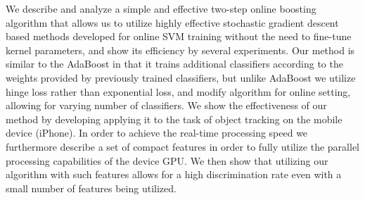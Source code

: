 


\begin{abstracts}        %

We describe and analyze a simple and effective two-step online boosting algorithm that allows us to utilize highly effective stochastic gradient descent based methods developed for online SVM training without the need to fine-tune kernel parameters, and show its efficiency by several experiments. Our method is similar to the AdaBoost in that it trains additional classifiers according to the weights provided by previously trained classifiers, but unlike AdaBoost we utilize hinge loss rather than exponential loss, and modify algorithm for online setting, allowing for varying number of classifiers. 
We show the effectiveness of our method by developing applying it to the task of object tracking on the mobile device (iPhone). In order to achieve the real-time processing speed we furthermore describe a set of compact features in order to fully utilize the parallel processing capabilities of the device GPU. We then show that utilizing our algorithm with such features allows for a high discrimination rate even with a small number of features being utilized.


\end{abstracts}


